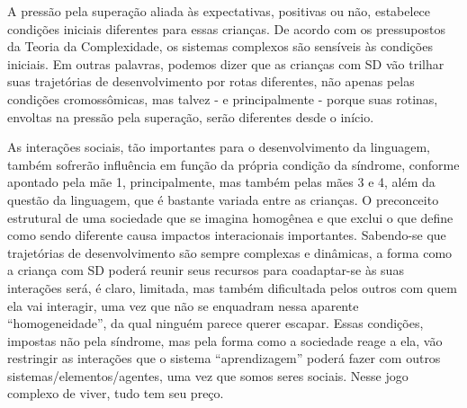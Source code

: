 \documentclass[output=paper,colorlinks,citecolor=brown,booklanguage=portuguese]{langscibook}
\begin{document}
A pressão pela superação aliada às expectativas, positivas ou não, estabelece condições iniciais diferentes para essas crianças. De acordo com os pressupostos da Teoria da Complexidade, os sistemas complexos são sensíveis às condições iniciais. Em outras palavras, podemos dizer que as crianças com SD vão trilhar suas trajetórias de desenvolvimento por rotas diferentes, não apenas pelas condições cromossômicas, mas talvez - e principalmente - porque suas rotinas, envoltas na pressão pela superação, serão diferentes desde o início.

As interações sociais, tão importantes para o desenvolvimento da linguagem, também sofrerão influência em função da própria condição da síndrome, conforme apontado pela mãe 1, principalmente, mas também pelas mães 3 e 4, além da questão da linguagem, que é bastante variada entre as crianças. O preconceito estrutural de uma sociedade que se imagina homogênea e que exclui o que define como sendo diferente causa impactos interacionais importantes. Sabendo-se que trajetórias de desenvolvimento são sempre complexas e dinâmicas, a forma como a criança com SD poderá reunir seus recursos para coadaptar-se às suas interações será, é claro, limitada, mas também dificultada pelos outros com quem ela vai interagir, uma vez que não se enquadram nessa aparente “homogeneidade”, da qual ninguém parece querer escapar. Essas condições, impostas não pela síndrome, mas pela forma como a sociedade reage a ela, vão restringir as interações que o sistema “aprendizagem” poderá fazer com outros sistemas/elementos/agentes, uma vez que somos seres sociais. Nesse jogo complexo de viver, tudo tem seu preço.
\end{document}
